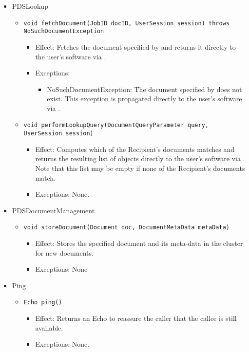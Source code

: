 \begin{itemize}
    \item PDSLookup
	\begin{itemize}
		\item \texttt{void fetchDocument(JobID docID, UserSession session) throws NoSuchDocumentException}
		\begin{itemize}
			\item Effect: Fetches the document specified by  and returns it directly to the user's software via .
			\item Exceptions:
			\begin{itemize}
				\item NoSuchDocumentException: The document specified by  does not exist. This exception is propagated directly to the user's software via .
			\end{itemize}
		\end{itemize}
				
		\item \texttt{void performLookupQuery(DocumentQueryParameter query, UserSession session)}
		\begin{itemize}
			\item Effect: Computes which of the Recipient's documents matches  and returns the resulting list of  objects directly to the user's software via . Note that this list may be empty if none of the Recipient's documents match.
			\item Exceptions: None.
		\end{itemize}
	\end{itemize}

    \item PDSDocumentManagement
	\begin{itemize}
		\item \texttt{void storeDocument(Document doc, DocumentMetaData metaData)}
		\begin{itemize}
			\item Effect: Stores the specified document and its meta-data in the cluster for new documents.
			\item Exceptions: None
		\end{itemize}
	\end{itemize}

	\item Ping
	\begin{itemize}
		\item \texttt{Echo ping()}
		\begin{itemize}
			\item Effect: Returns an Echo to reassure the caller that the callee is still available.
			\item Exceptions: None.
		\end{itemize}
	\end{itemize}
\end{itemize}

